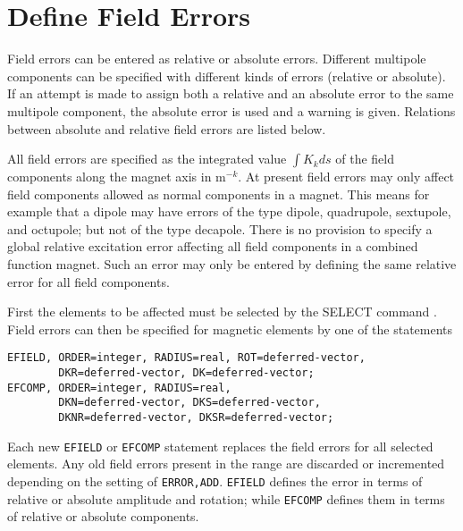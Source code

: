 \section{Define Field Errors}
\label{sec:errorfield}

Field errors can be entered as relative or absolute errors.
Different multipole components can be specified with
different kinds of errors (relative or absolute).
If an attempt is made to assign both a relative
and an absolute error to the same multipole component,
the absolute error is used and a warning is given.
Relations between absolute and relative field errors are listed below.

All field errors are specified as the integrated value $\int K_k ds$ of the
field components along the magnet axis in $\mathrm{m}^{-k}$.
At present field errors may only affect field components
allowed as normal components in a magnet.
This means for example that a dipole may have errors of the type dipole,
quadrupole, sextupole, and octupole; but not of the type decapole.
There is no provision to specify a global relative
excitation error affecting all field components in a combined function
magnet.
Such an error may only be entered by defining the same relative error
for all field components.

First the elements to be affected must be selected by the
{SELECT} command .
Field errors can then be specified for magnetic elements
by one of the statements
\begin{verbatim}
EFIELD, ORDER=integer, RADIUS=real, ROT=deferred-vector,
        DKR=deferred-vector, DK=deferred-vector;
EFCOMP, ORDER=integer, RADIUS=real,
        DKN=deferred-vector, DKS=deferred-vector,
        DKNR=deferred-vector, DKSR=deferred-vector;
\end{verbatim}
Each new \texttt{EFIELD} or \texttt{EFCOMP} statement
replaces the field errors for all selected elements.
Any old field errors present in the range are discarded
or incremented depending on the setting of \texttt{ERROR,ADD}.
\texttt{EFIELD} defines the error in terms
of relative or absolute amplitude and rotation;
while \texttt{EFCOMP} defines them in terms
of relative or absolute components.

